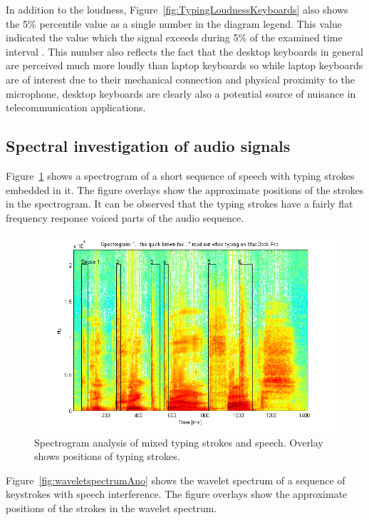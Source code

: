 In addition to the loudness, Figure~\ref{fig:TypingLoudnessKeyboards} also shows the 5\% percentile value as a single number in the diagram legend. This value indicated the value which the signal exceeds during 5\% of the examined time interval \cite{Hauswirth2013}. This number also reflects the fact that the desktop keyboards in general are perceived much more loudly than laptop keyboards so while laptop keyboards are of interest due to their mechanical connection and physical proximity to the microphone, desktop keyboards are clearly also a potential source of nuisance in telecommunication applications.

\subsection{Spectral investigation of audio signals}
Figure~\ref{fig:spectrogramMarkedTapsBrownFox} shows a spectrogram of a short sequence of speech with typing strokes embedded in it. The figure overlays show the approximate positions of the strokes in the spectrogram. It can be observed that the typing strokes have a fairly flat frequency response \DIFdelbegin {}\DIFdelend \DIFaddbegin {}\DIFaddend voiced parts of the audio sequence.

\begin{figure}[!] %
\centering
\includegraphics[width=150mm]{spectrogramMarkedTapsBrownFox.png}
\caption{Spectrogram analysis of mixed typing strokes and speech. Overlay shows positions of typing strokes.}\label{fig:spectrogramMarkedTapsBrownFox}
\end{figure}

Figure~\ref{fig:waveletspectrumAno} shows the wavelet spectrum of a sequence of keystrokes with speech interference. The figure overlays show the approximate positions of the strokes in the wavelet spectrum. \DIFaddbegin \label{corrections:motherWavelet}


